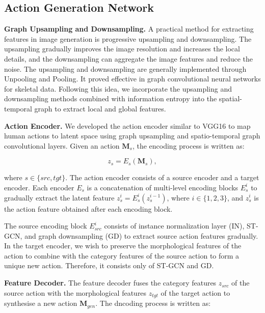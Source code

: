 \subsection{Action Generation Network}

\textbf{Graph Upsampling and Downsampling. }
A practical method for extracting features in image generation is progressive upsampling and downsampling. The upsampling gradually improves the image resolution and increases the local details, and the downsampling can aggregate the image features and reduce the noise. 
The upsampling and downsampling are generally implemented through Unpooling and Pooling. It proved effective in graph convolutional neural networks for skeletal data\cite{jang2022motion, yan2019convolutional, ParkSoomin2021Diverse}. 
Following this idea, we incorporate the upsampling and downsampling methods combined with information entropy into the spatial-temporal graph to extract local and global features. 

\textbf{Action Encoder. }
We developed the action encoder similar to VGG16 \cite{simonyan2014very} to map human actions to latent space using graph upsampling and spatio-temporal graph convolutional layers. Given an action $\textbf{M}_s$, the encoding process is written as: 

\begin{equation}\label{e2}
z_s=E_s(\textbf{M}_s),
\end{equation}

\noindent where $s\in \{src, tgt\}$.
The action encoder consists of a source encoder and a target encoder. 
Each encoder $E_s$ is a concatenation of multi-level encoding blocks $E_s^i$ to gradually extract the latent feature $z_s^i=E_s^i(z_s^{i-1})$, where $i\in \{1,2,3\}$, and $z_s^i$ is the action feature obtained after each encoding block. 

The source encoding block $E^i_{src}$ consists of instance normalization layer (IN), ST-GCN, and graph downsampling (GD) to extract source action features gradually. 
In the target encoder, we wish to preserve the morphological features of the action to combine with the category features of the source action to form a unique new action. Therefore, it consists only of ST-GCN and GD. 

\textbf{Feature Decoder. }
The feature decoder fuses the category features $z_{src}$ of the source action with the morphological features $z_{tgt}$ of the target action to synthesise a new action $\textbf{M}_{gen}$. The dncoding process is written as: 

